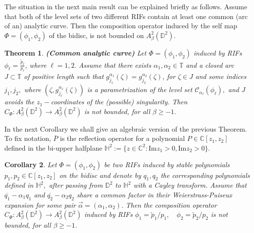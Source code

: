 \documentclass[12pt]{amsart}
\newtheorem{theorem}{Theorem}[section]
\newtheorem{corollary}[theorem]{Corollary}
\numberwithin{equation}{section}
\begin{document}
The situation in the next main result can be explained briefly as follows. Assume that both of the level sets of two different RIFs contain at least one common (arc of an) analytic curve. Then the composition operator induced by the self map $\Phi=(\phi_1,\phi_2)$ of the bidisc, is not bounded on $A^2_{\beta}(\mathbb{D}^2).$
\begin{theorem}\label{exceptionalcurve}\textbf{(Common analytic curve)} Let $\Phi=(\phi_1,\phi_2)$ induced by RIFs $\phi_\ell=\frac{\widetilde{p}_\ell}{p_\ell}$, where $\ell=1,2.$
Assume that there exists  $\alpha_1,\alpha_2\in\mathbb{T}$ and a closed arc $J\subset \mathbb{T}$ of positive length such that $g^{\alpha_1}_{j_1}(\zeta)=g^{\alpha_2}_{j_2}(\zeta)$, for $\zeta\in J$ and some indices $j_1,j_2,$ where $(\zeta,g^{\alpha_\ell}_{j_\ell}(\zeta))$ is a parametrization of the level set $\mathcal{C}_{\alpha_\ell}(\phi_\ell),$ and $J$ avoids the $z_1-$coordinates of the (possible) singularity. Then $C_{\Phi}:A^2_{\beta}(\mathbb{D}^2)\to A^2_{\beta}(\mathbb{D}^2)$ is not bounded, for all $\beta\ge-1.$
\end{theorem}
In the next Corollary we shall give an algebraic version of the previous Theorem. To fix notation, $\overline{P}$ is the reflection operator for a polynomial $P\in\mathbb{C}[z_1,z_2]$ defined in the bi-upper halfplane $\mathbb{H}^2:=\{z\in\mathbb{C}^2:\mathrm{Im}z_1>0,\mathrm{Im}z_2>0\}.$ 
\begin{corollary}\label{Puiseux2} Let $\Phi=(\phi_1,\phi_2)$ be two RIFs induced by stable polynomials $p_1,p_2\in\mathbb{C}[z_1,z_2]$ on the bidisc and denote by $q_1,q_2$ the corresponding polynomials defined in $\mathbb{H}^2,$ after passing from $\mathbb{D}^2$ to $\mathbb{H}^2$ with a Cayley transform. Assume that $\overline{q_1}-\alpha_1q_1$ and $\overline{q_2}-\alpha_2q_2$ share a common factor in their Weierstrass-Puiseux expansion for some pair $\vec{\alpha}=(\alpha_1,\alpha_2).$ Then the composition operator $C_{\Phi}:A^2_{\beta}(\mathbb{D}^2)\to A^2_{\beta}(\mathbb{D}^2)$ induced by RIFs $\phi_1=\widetilde{p}_1/p_1,\quad \phi_2=\widetilde{p}_2/p_2$ is not bounded, for all $\beta\ge-1$.
\end{corollary}
\end{document}
